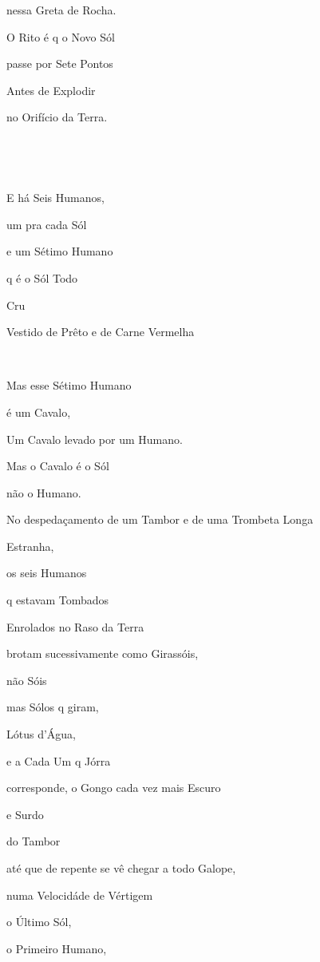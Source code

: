 nessa Greta de Rocha.

O Rito é q o Novo Sól

passe por Sete Pontos

Antes de Explodir

no Orifício da Terra.

~


~

E há Seis Humanos,


um pra cada Sól

e um Sétimo Humano

q é o Sól Todo

Cru

Vestido de Prêto e de Carne Vermelha

~

Mas esse Sétimo Humano

é um Cavalo,


Um Cavalo levado por um Humano.


Mas o Cavalo é o Sól

não o Humano.

No despedaçamento de um Tambor e de uma Trombeta Longa

Estranha, 

os seis Humanos

q estavam Tombados

Enrolados no Raso da Terra

brotam sucessivamente como Girassóis,

não Sóis

mas Sólos q giram,

Lótus d'Água, 

e a Cada Um q Jórra

corresponde, o Gongo cada vez mais Escuro

e Surdo

do Tambor

até que de repente se vê chegar a todo Galope,

numa Velocidáde de Vértigem

o Último Sól, 

o Primeiro Humano,

